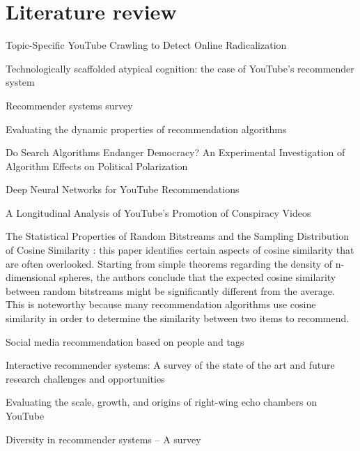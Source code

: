 
\chapter{Literature review}

Topic-Specific YouTube Crawling to Detect Online Radicalization
\citet{agarwal_topic-specific_2015}

Technologically scaffolded atypical cognition: the case of YouTube's recommender
system \citet{alfano_technologically_2020}

Recommender systems survey \citet{bobadilla_recommender_2013}

Evaluating the dynamic properties of recommendation algorithms
\citet{burke_evaluating_2010}

Do Search Algorithms Endanger Democracy? An Experimental Investigation of
Algorithm Effects on Political Polarization \citet{cho_search_2020}

Deep Neural Networks for YouTube Recommendations \citet{covington_deep_2016}

A Longitudinal Analysis of YouTube's Promotion of Conspiracy Videos
\citet{faddoul_longitudinal_2020}

The Statistical Properties of Random Bitstreams and the Sampling Distribution of
Cosine Similarity \citet{giller_statistical_2012}: this paper identifies certain
aspects of cosine similarity that are often overlooked. Starting from simple
theorems regarding the density of n-dimensional spheres, the authors conclude
that the expected cosine similarity between random bitstreams might be
significantly different from the average. This is noteworthy because many
recommendation algorithms use cosine similarity in order to determine the
similarity between two items to recommend.

Social media recommendation based on people and tags \citet{guy_social_2010}

Interactive recommender systems: A survey of the state of the art and future
research challenges and opportunities \citet{he_interactive_2016}

Evaluating the scale, growth, and origins of right-wing echo chambers on YouTube
\citet{hosseinmardi_evaluating_2020}

Diversity in recommender systems – A survey \citet{kunaver_diversity_2017}

